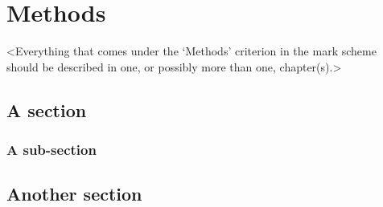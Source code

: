\chapter{Methods}
\label{chapter2}

<Everything that comes under the `Methods' criterion in the mark scheme should be described in one, or possibly more than one, chapter(s).>

\section{A section}
\lipsum[5]

\subsection{A sub-section}
\lipsum[6]

\section{Another section}
\lipsum[7]
